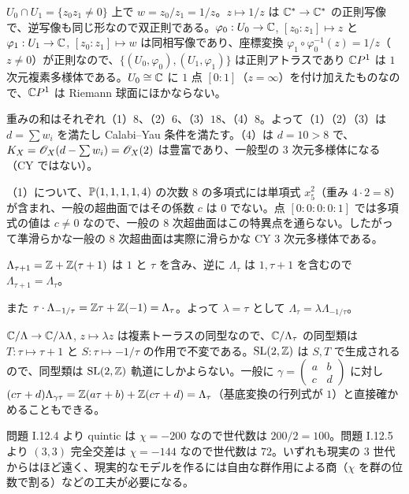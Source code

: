 $U_0\cap U_1=\{z_0z_1\neq0\}$ 上で $w=z_0/z_1=1/z$。$z\mapsto 1/z$ は $\mathbb{C}^*\to\mathbb{C}^*$ の正則写像で、逆写像も同じ形なので双正則である。$\varphi_0:U_0\to\mathbb{C}$, $[z_0:z_1]\mapsto z$ と $\varphi_1:U_1\to\mathbb{C}$, $[z_0:z_1]\mapsto w$ は同相写像であり、座標変換 $\varphi_1\circ\varphi_0^{-1}(z)=1/z$（$z\neq0$）が正則なので、$\{(U_0,\varphi_0),(U_1,\varphi_1)\}$ は正則アトラスであり $\mathbb{C} P^1$ は $1$ 次元複素多様体である。$U_0\cong\mathbb{C}$ に $1$ 点 $[0:1]$（$z=\infty$）を付け加えたものなので、$\mathbb{C} P^1$ は Riemann 球面にほかならない。

重みの和はそれぞれ（1）$8$、（2）$6$、（3）$18$、（4）$8$。よって（1）（2）（3）は $d=\sum w_i$ を満たし Calabi--Yau 条件を満たす。（4）は $d=10>8$ で、$K_X=\mathscr{O}_X(d-\sum w_i)=\mathscr{O}_X(2)$ は豊富であり、一般型の $3$ 次元多様体になる（CY ではない）。

（1）について、$\mathbb{P}(1,1,1,1,4)$ の次数 $8$ の多項式には単項式 $x_5^2$（重み $4\cdot2=8$）が含まれ、一般の超曲面ではその係数 $c$ は $0$ でない。点 $[0:0:0:0:1]$ では多項式の値は $c\neq0$ なので、一般の $8$ 次超曲面はこの特異点を通らない。したがって準滑らかな一般の $8$ 次超曲面は実際に滑らかな CY $3$ 次元多様体である。

$\Lambda_{\tau+1}=\mathbb{Z}+\mathbb{Z}(\tau+1)$ は $1$ と $\tau$ を含み、逆に $\Lambda_\tau$ は $1,\tau+1$ を含むので $\Lambda_{\tau+1}=\Lambda_\tau$。

また $\tau\cdot\Lambda_{-1/\tau}=\mathbb{Z}\tau+\mathbb{Z}(-1)=\Lambda_\tau$。よって $\lambda=\tau$ として $\Lambda_\tau=\lambda\Lambda_{-1/\tau}$。

$\mathbb{C}/\Lambda\to\mathbb{C}/\lambda\Lambda$, $z\mapsto\lambda z$ は複素トーラスの同型なので、$\mathbb{C}/\Lambda_\tau$ の同型類は $T:\tau\mapsto\tau+1$ と $S:\tau\mapsto-1/\tau$ の作用で不変である。$\operatorname{SL}(2,\mathbb{Z})$ は $S,T$ で生成されるので、同型類は $\operatorname{SL}(2,\mathbb{Z})$ 軌道にしかよらない。一般に $\gamma=\begin{pmatrix}a&b\\c&d\end{pmatrix}$ に対し $(c\tau+d)\Lambda_{\gamma\tau}=\mathbb{Z}(a\tau+b)+\mathbb{Z}(c\tau+d)=\Lambda_\tau$（基底変換の行列式が $1$）と直接確かめることもできる。

問題 I.12.4 より quintic は $\chi=-200$ なので世代数は $200/2=100$。問題 I.12.5 より $(3,3)$ 完全交差は $\chi=-144$ なので世代数は $72$。いずれも現実の $3$ 世代からはほど遠く、現実的なモデルを作るには自由な群作用による商（$\chi$ を群の位数で割る）などの工夫が必要になる。

